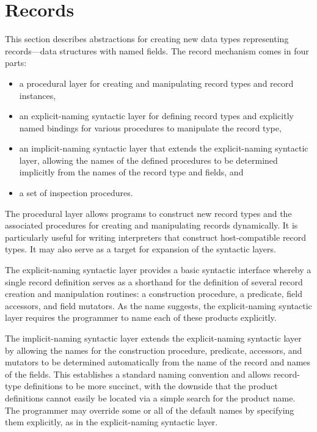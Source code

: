 \chapter{Records}
\label{recordschapter}

This section describes abstractions for creating new data types
representing records---data structures with named fields. The record
mechanism comes in four parts:

\begin{itemize}
\item a procedural layer for creating and manipulating record types and record
  instances,
\item an explicit-naming syntactic layer for defining record types and
  explicitly named bindings for various procedures to manipulate the record
  type,
\item an implicit-naming syntactic layer that extends the explicit-naming
  syntactic layer, allowing the names of the defined procedures to be
  determined implicitly from the names of the record type and fields, and
\item a set of inspection procedures.
\end{itemize}
% 
The procedural layer allows programs to construct new record types
and the associated procedures for creating and manipulating records
dynamically.
It is particularly useful for writing interpreters that construct
host-compatible record types.  It may also serve as a target for expansion
of the syntactic layers.

The explicit-naming syntactic layer provides a basic syntactic interface
whereby a single record definition serves as a shorthand for the definition of
several record creation and manipulation routines: a construction procedure, a
predicate, field accessors, and field mutators. As the name suggests, the
explicit-naming syntactic layer requires the programmer to name each of these
products explicitly.

The implicit-naming syntactic layer extends the explicit-naming syntactic layer
by allowing the names for the construction procedure, predicate, accessors, and
mutators to be determined automatically from the name of the record and names
of the fields. This establishes a standard naming convention and allows
record-type definitions to be more succinct, with the downside that the product
definitions cannot easily be located via a simple search for the product name.
The programmer may override some or all of the default names by specifying them
explicitly, as in the explicit-naming syntactic layer.

